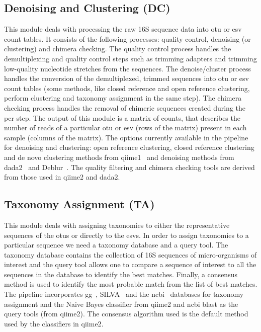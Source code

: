   \subsection*{Denoising and Clustering (DC)}
  \vspace{-5mm}
  This module deals with processing the raw 16S sequence data into \ac{otu} or \ac{esv} count tables.
  It consists of the following processes: quality control, denoising (or clustering) and chimera checking.
  The quality control process handles the demultiplexing and quality control steps such as trimming adapters and trimming low-quality nucleotide stretches from the sequences.
  The denoise/cluster process handles the conversion of the demultiplexed, trimmed sequences into \ac{otu} or \ac{esv} count tables (some methods, like closed reference and open reference clustering, perform clustering and taxonomy assignment in the same step).
  The chimera checking process handles the removal of chimeric sequences created during the \ac{pcr} step.
  The output of this module is a matrix of counts, that describes the number of reads of a particular \ac{otu} or \ac{esv} (rows of the matrix) present in each sample (columns of the matrix).
  The options currently available in the pipeline for denoising and clustering: open reference clustering, closed reference clustering and de novo clustering methods from \ac{qiime1}~\cite{Caporaso2010} and denoising methods from \ac{dada2}~\cite{Callahan2016} and Deblur~\cite{Amir2017}.
  The quality filtering and chimera checking tools are derived from those used in \ac{qiime2} and \ac{dada2}. 


  \subsection*{Taxonomy Assignment (TA)}
  \vspace{-5mm}
  This module deals with assigning taxonomies to either the representative sequences of the \ac{otu}s or directly to the \ac{esv}s.
  In order to assign taxonomies to a particular sequence we need a taxonomy database and a query tool.
  The taxonomy database contains the collection of 16S sequences of micro-organisms of interest and the query tool allows one to compare a sequence of interest to all the sequences in the database to identify the best matches. Finally, a consensus method is used to identify the most probable match from the list of best matches.
  The pipeline incorporates \ac{gg}~\cite{DeSantis2006}, SILVA~\cite{Quast2012} and the \ac{ncbi}~\cite{Sayers2009} databases for taxonomy assignment and the Naive Bayes classifier from \ac{qiime2} and \ac{ncbi} blast as the query tools (from \ac{qiime2}).
  The consensus algorithm used is the default method used by the classifiers in \ac{qiime2}.

